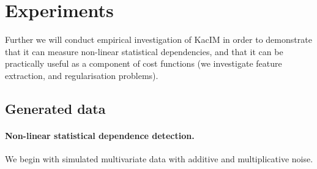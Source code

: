 \documentclass{article}
\begin{document}
{\section{Experiments}
\label{section:experiments}

Further we will conduct empirical investigation of KacIM in order to demonstrate that it can measure non-linear statistical dependencies, and that it can be practically useful as a component of cost functions (we investigate feature extraction, and regularisation problems).

\subsection{Generated data}

\paragraph{Non-linear statistical dependence detection.} We begin with simulated multivariate data with additive and multiplicative noise.


}
\end{document}
